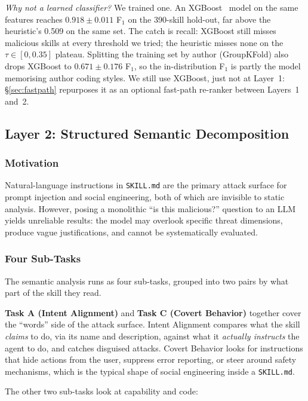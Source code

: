 \documentclass[sigconf,nonacm]{acmart}
\begin{document}
\emph{Why not a learned classifier?} We trained one. An XGBoost~\cite{chen2016xgboost} model on the same features reaches $0.918 \pm 0.011$ F$_1$ on the 390-skill hold-out, far above the heuristic's 0.509 on the same set. The catch is recall: XGBoost still misses malicious skills at every threshold we tried; the heuristic misses none on the $\tau \in [0, 0.35]$ plateau. Splitting the training set by author (GroupKFold) also drops XGBoost to $0.671 \pm 0.176$ F$_1$, so the in-distribution F$_1$ is partly the model memorising author coding styles. We still use XGBoost, just not at Layer~1: \S\ref{sec:fastpath} repurposes it as an optional fast-path re-ranker between Layers~1 and~2.

\subsection{Layer 2: Structured Semantic Decomposition}
\label{sec:layer2}

\subsubsection{Motivation}
Natural-language instructions in \texttt{SKILL.md} are the primary attack surface for prompt injection and social engineering, both of which are invisible to static analysis. However, posing a monolithic ``is this malicious?'' question to an LLM yields unreliable results: the model may overlook specific threat dimensions, produce vague justifications, and cannot be systematically evaluated.

\subsubsection{Four Sub-Tasks}
The semantic analysis runs as four sub-tasks, grouped into two pairs by what part of the skill they read.

\textbf{Task A (Intent Alignment)} and \textbf{Task C (Covert Behavior)} together cover the ``words'' side of the attack surface. Intent Alignment compares what the skill \emph{claims} to do, via its name and description, against what it \emph{actually instructs} the agent to do, and catches disguised attacks. Covert Behavior looks for instructions that hide actions from the user, suppress error reporting, or steer around safety mechanisms, which is the typical shape of social engineering inside a \texttt{SKILL.md}.

The other two sub-tasks look at capability and code:
\end{document}
